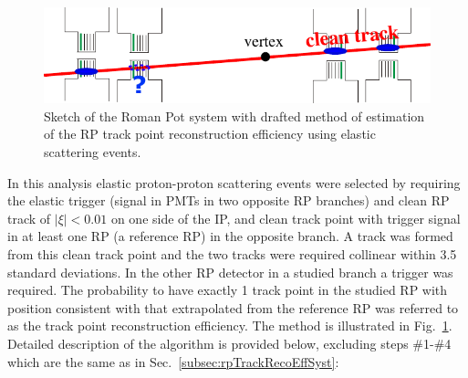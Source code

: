 \begin{figure}[h]%
	\centering
	\parbox{0.65\textwidth}{%
		\centering%
		\includegraphics[width=\linewidth]{graphics/systematicsEfficiency/RpSyst/effCalculationScheme_2.pdf}%
	} 
	\quad
	\parbox{0.31\textwidth}{ 
		\centering
			\caption[Draft of the method of estimation of the RP track point reconstruction efficiency for systematic uncertainty determination.]%
			{Sketch of the Roman Pot system with drafted method of estimation of the RP track point reconstruction efficiency using elastic scattering events.}\label{fig:sketchRpTrackPointEffSyst}%
	}
	
\end{figure}

In this analysis elastic proton-proton scattering events were selected by requiring the elastic trigger (signal in PMTs in two opposite RP branches) and clean RP track of $|\xi|<0.01$ on one side of the IP, and clean track point with trigger signal in at least one RP (a reference RP) in the opposite branch. A track was formed from this clean track point and the two tracks were required collinear within 3.5 standard deviations. In the other RP detector in a studied branch a trigger was required. The probability to have exactly 1 track point in the studied RP with position consistent with that extrapolated from the reference RP was referred to as the track point reconstruction efficiency. The method is illustrated in Fig.~\ref{fig:sketchRpTrackPointEffSyst}. Detailed description of the algorithm is provided below, excluding steps \#1-\#4 which are the same as in Sec.~\ref{subsec:rpTrackRecoEffSyst}:


